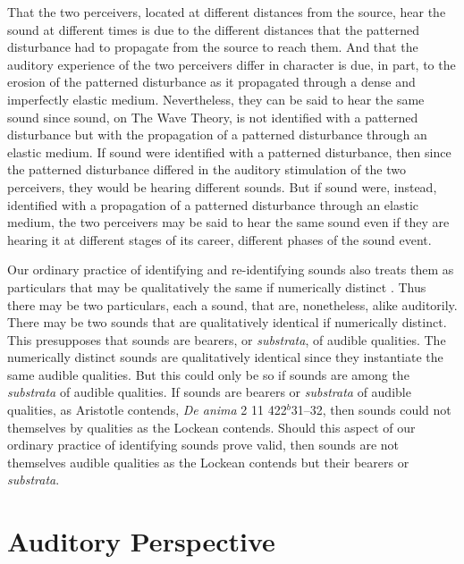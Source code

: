 That the two perceivers, located at different distances from the source, hear the sound at different times is due to the different distances that the patterned disturbance had to propagate from the source to reach them. And that the auditory experience of the two perceivers differ in character is due, in part, to the erosion of the patterned disturbance as it propagated through a dense and imperfectly elastic medium. Nevertheless, they can be said to hear the same sound since sound, on The Wave Theory, is not identified with a patterned disturbance but with the propagation of a patterned disturbance through an elastic medium. If sound were identified with a patterned disturbance, then since the patterned disturbance differed in the auditory stimulation of the two perceivers, they would be hearing different sounds. But if sound were, instead, identified with a propagation of a patterned disturbance through an elastic medium, the two perceivers may be said to hear the same sound even if they are hearing it at different stages of its career, different phases of the sound event.

Our ordinary practice of identifying and re-identifying sounds also treats them as particulars that may be qualitatively the same if numerically distinct \citep[70]{Nudds:2009sf}. Thus there may be two particulars, each a sound, that are, nonetheless, alike auditorily. There may be two sounds that are qualitatively identical if numerically distinct. This presupposes that sounds are bearers, or \emph{substrata}, of audible qualities. The numerically distinct sounds are qualitatively identical since they instantiate the same audible qualities. But this could only be so if sounds are among the \emph{substrata} of audible qualities. If sounds are bearers or \emph{substrata} of audible qualities, as Aristotle contends, \emph{De anima} 2 11 422\( ^{b} \)31--32, then sounds could not themselves by qualities as the Lockean contends. Should this aspect of our ordinary practice of identifying sounds prove valid, then sounds are not themselves audible qualities as the Lockean contends but their bearers or \emph{substrata}. 


\section{Auditory Perspective} %
\label{sec:auditory_perspective}


